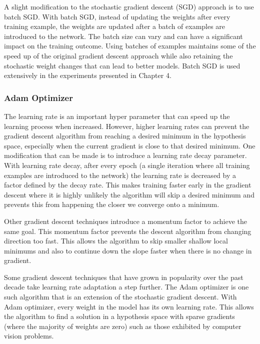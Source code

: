A slight modification to the stochastic gradient descent (SGD) approach is to use batch SGD. With batch SGD, instead of updating the weights after every training example, the weights are updated after a batch of examples are introduced to the network. The batch size can vary and can have a significant impact on the training outcome. Using batches of examples maintains some of the speed up of the original gradient descent approach while also retaining the stochastic weight changes that can lead to better models. Batch SGD is used extensively in the experiments presented in Chapter 4.

\subsubsection{Adam Optimizer}

The learning rate is an important hyper parameter that can speed up the learning process when increased. However, higher learning rates can prevent the gradient descent algorithm from reaching a desired minimum in the hypothesis space, especially when the current gradient is close to that desired minimum. One modification that can be made is to introduce a learning rate decay parameter. With learning rate decay, after every epoch (a single iteration where all training examples are introduced to the network) the learning rate is decreased by a factor defined by the decay rate. This makes training faster early in the gradient descent where it is highly unlikely the algorithm will skip a desired minimum and prevents this from happening the closer we converge onto a minimum\cite{Mitchell}.

Other gradient descent techniques introduce a momentum factor to achieve the same goal. This momentum factor prevents the descent algorithm from changing direction too fast. This allows the algorithm to skip smaller shallow local minimums and also to continue down the slope faster when there is no change in gradient\cite{Mitchell}.

Some gradient descent techniques that have grown in popularity over the past decade take learning rate adaptation a step further. The Adam optimizer is one such algorithm that is an extension of the stochastic gradient descent. With Adam optimizer, every weight in the model has its own learning rate. This allows the algorithm to find a solution in a hypothesis space with sparse gradients (where the majority of weights are zero) such as those exhibited by computer vision problems\cite{DBLP:journals/corr/KingmaB14}.

